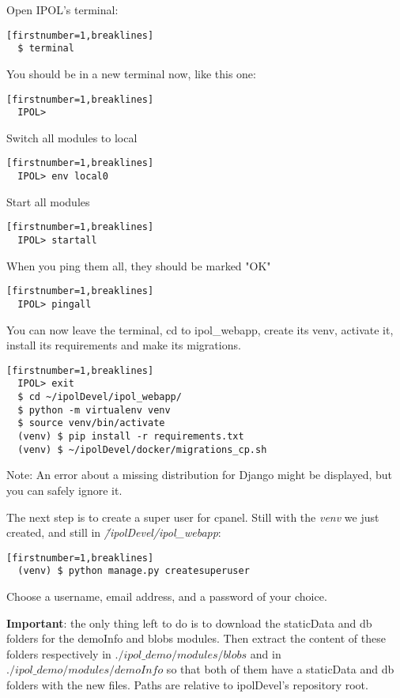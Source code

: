 \documentclass[a4paper,12pt]{article}
\begin{document}
Open IPOL's terminal:
\begin{verbatim}[firstnumber=1,breaklines]
  $ terminal
\end{verbatim}

You should be in a new terminal now, like this one:
\begin{verbatim}[firstnumber=1,breaklines]
  IPOL>
\end{verbatim}

Switch all modules to local
\begin{verbatim}[firstnumber=1,breaklines]
  IPOL> env local0
\end{verbatim}

Start all modules
\begin{verbatim}[firstnumber=1,breaklines]
  IPOL> startall
\end{verbatim}

When you ping them all, they should be marked "OK"
\begin{verbatim}[firstnumber=1,breaklines]
  IPOL> pingall
\end{verbatim}

You can now leave the terminal, cd to ipol\_webapp, create its venv, activate it, install its 
requirements and make its migrations.
\begin{verbatim}[firstnumber=1,breaklines]
  IPOL> exit
  $ cd ~/ipolDevel/ipol_webapp/
  $ python -m virtualenv venv
  $ source venv/bin/activate
  (venv) $ pip install -r requirements.txt
  (venv) $ ~/ipolDevel/docker/migrations_cp.sh
\end{verbatim}

Note: An error about a missing distribution for Django might be displayed, but you can safely ignore it.

The next step is to create a super user for cpanel. Still with the \emph{venv} we just created, and
still in \emph{\~/ipolDevel/ipol\_webapp}:
\begin{verbatim}[firstnumber=1,breaklines]
  (venv) $ python manage.py createsuperuser
\end{verbatim}

Choose a username, email address, and a password of your choice.

\textbf{Important}: the only thing left to do is to download the staticData and db folders for the demoInfo
and blobs modules. 
Then extract the content of these folders respectively in \emph{$./ipol\_demo/modules/blobs$}
and in \emph{$./ipol\_demo/modules/demoInfo$} so that both of them have a staticData and db folders
with the new files. Paths are relative to ipolDevel's repository root.
\end{document}
